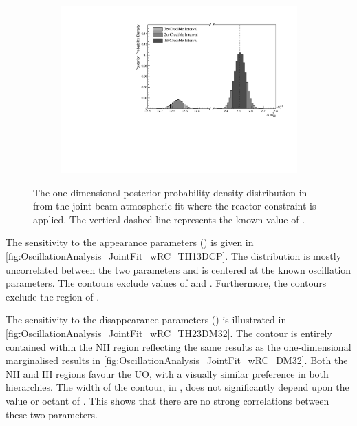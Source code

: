 \begin{figure}[h]
  \begin{subfigure}[t]{0.98\textwidth}
    \includegraphics[width=\textwidth, trim={0mm 0mm 0mm 0mm}, clip,page=1]{Figures/OA/JointFit_wRC/Contours_1D_dm32_BH_1_wRC_UnSmeared_CredibleInterval.pdf}
  \end{subfigure}
  \caption{The one-dimensional posterior probability density distribution in  from the joint beam-atmospheric fit where the reactor constraint is applied. The vertical dashed line represents the known value of .}
  \label{fig:OscillationAnalysis_JointFit_wRC_DM32}
\end{figure}

The sensitivity to the appearance parameters () is given in \autoref{fig:OscillationAnalysis_JointFit_wRC_TH13DCP}. The distribution is mostly uncorrelated between the two parameters and is centered at the known oscillation parameters. The \quickmath{1\sigma} contours exclude values of  and . Furthermore, the \quickmath{3\sigma} contours exclude the region of .

The sensitivity to the disappearance parameters () is illustrated in \autoref{fig:OscillationAnalysis_JointFit_wRC_TH23DM32}. The \quickmath{1\sigma} contour is entirely contained within the NH region reflecting the same results as the one-dimensional marginalised results in \autoref{fig:OscillationAnalysis_JointFit_wRC_DM32}. Both the NH and IH regions favour the UO, with a visually similar preference in both hierarchies. The width of the \quickmath{1\sigma} contour, in , does not significantly depend upon the value or octant of . This shows that there are no strong correlations between these two parameters.

